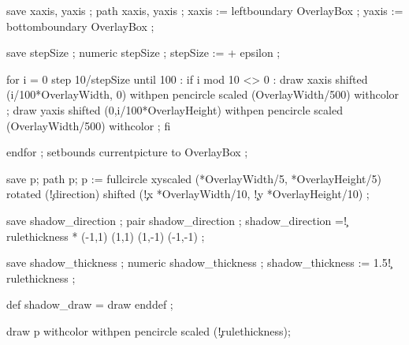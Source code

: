   save xaxis, yaxis ; path xaxis, yaxis ;
  xaxis := leftboundary OverlayBox ;
  yaxis := bottomboundary OverlayBox ;


  save stepSize ; numeric stepSize ;
  stepSize :=  + epsilon ;

  for i = 0 step 10/stepSize until 100 :
    if i mod 10 <> 0 :
      draw xaxis shifted (i/100*OverlayWidth, 0) 
                 withpen pencircle scaled (OverlayWidth/500) 
                 withcolor \MPcolor\simpleslidesGridColor ;
      draw yaxis shifted (0,i/100*OverlayHeight) 
                 withpen pencircle scaled (OverlayWidth/500) 
                 withcolor \MPcolor\simpleslidesGridColor ;
    fi 

  endfor ;
  setbounds currentpicture to OverlayBox ;
\stopuseMPgraphic



  save p; path p;
  p := fullcircle xyscaled 
       (*OverlayWidth/5,
        *OverlayHeight/5) 
       rotated (\simpleslidesPictureParameter\c!direction) 
       shifted
       (\simpleslidesPictureParameter\c!x *OverlayWidth/10,
        \simpleslidesPictureParameter\c!y *OverlayHeight/10)  ;

  \ifcase \simpleslidesShadow \else
  
  save shadow_direction ; pair shadow_direction ;
  shadow_direction =\simpleslidesPictureParameter\c!rulethickness * 
     \ifcase \simpleslidesShadow \or
          (-1,1) \or (1,1) \or (1,-1) \or (-1,-1) \fi ;


  save shadow_thickness ; numeric shadow_thickness ;
  shadow_thickness := 1.5\simpleslidesPictureParameter\c!rulethickness ;

  def shadow_draw = draw enddef ;

  \fi

  draw p withcolor  
       withpen pencircle scaled (\simpleslidesPictureParameter\c!rulethickness);

